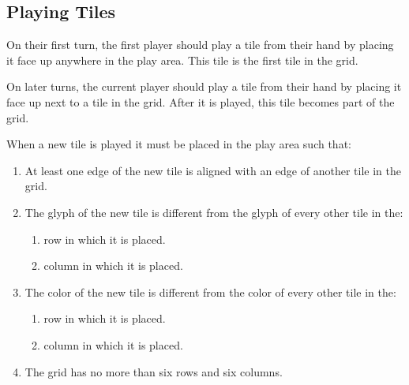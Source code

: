 \documentclass[a4paper, 10pt, notumble]{leaflet}
\begin{document}
\subsection{Playing Tiles}
On their first turn, the first player should play a tile from their hand by placing it face up anywhere in the play area. This tile is the first tile in the grid.

On later turns, the current player should play a tile from their hand by placing it face up next to a tile in the grid. After it is played, this tile becomes part of the grid.

When a new tile is played it must be placed in the play area such that:
\begin{enumerate}
  \item At least one edge of the new tile is aligned with an edge of another tile in the grid.
  \item The glyph of the new tile is different from the glyph of every other tile in the:
  \begin{enumerate}
  	\item row in which it is placed.
    	\item column in which it is placed.
  \end{enumerate}
  \item The color of the new tile is different from the color of every other tile in the:
  \begin{enumerate}
  	\item row in which it is placed.
    \item column in which it is placed.
  \end{enumerate}
  \item The grid has no more than six rows and six columns.
\end{enumerate}

\newpage
\end{document}
